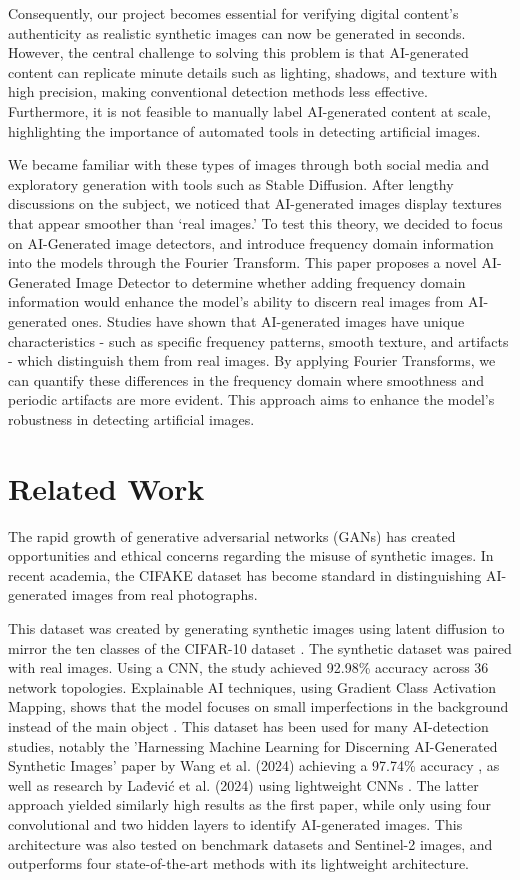 Consequently, our project becomes essential for verifying digital content's authenticity as realistic synthetic images can now be generated in seconds. However, the central challenge to solving this problem is that AI-generated content can replicate minute details such as lighting, shadows, and texture with high precision, making conventional detection methods less effective. Furthermore, it is not feasible to manually label AI-generated content at scale, highlighting the importance of automated tools in detecting artificial images.

We became familiar with these types of images through both social media and exploratory generation with tools such as Stable Diffusion. After lengthy discussions on the subject, we noticed that AI-generated images display textures that appear smoother than ‘real images.’ To test this theory, we decided to focus on AI-Generated image detectors, and introduce frequency domain information into the models through the Fourier Transform. This paper proposes a novel AI-Generated Image Detector to determine whether adding frequency domain information would enhance the model’s ability to discern real images from AI-generated ones. Studies have shown that AI-generated images have unique characteristics - such as specific frequency patterns, smooth texture, and artifacts - which distinguish them from real images. By applying Fourier Transforms, we can quantify these differences in the frequency domain where smoothness and periodic artifacts are more evident. This approach aims to enhance the model's robustness in detecting artificial images.

\section{Related Work}

The rapid growth of generative adversarial networks (GANs) has created opportunities and ethical concerns regarding the misuse of synthetic images. In recent academia, the CIFAKE dataset has become standard in distinguishing AI-generated images from real photographs.

This dataset was created by generating synthetic images using latent diffusion to mirror the ten classes of the CIFAR-10 dataset \cite{2}. The synthetic dataset was paired with real images. Using a CNN, the study achieved 92.98\% accuracy across 36 network topologies. Explainable AI techniques, using Gradient Class Activation Mapping, shows that the model focuses on small imperfections in the background instead of the main object \cite{1}. This dataset has been used for many AI-detection studies, notably the 'Harnessing Machine Learning for Discerning AI-Generated Synthetic Images' paper by Wang et al. (2024) achieving a 97.74\% accuracy \cite{3}, as well as research by Lađević et al. (2024) using lightweight CNNs \cite{4}. The latter approach yielded similarly high results as the first paper, while only using four convolutional and two hidden layers to identify AI-generated images. This architecture was also tested on benchmark datasets and Sentinel-2 images, and outperforms four state-of-the-art methods with its lightweight architecture.

